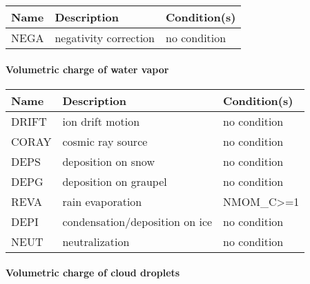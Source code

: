 \begin{longtable} {|p{}|p{}|p{}|}
\hline
Name & Description & Condition(s) \\
\hline \hline
\endhead
NEGA   & negativity correction & no condition \\\hline
\end{longtable}

\paragraph{Volumetric charge of water vapor}
\mbox{} %

\begin{longtable} {|p{}|p{}|p{}|}
\hline
Name & Description & Condition(s) \\
\hline \hline
\endhead
DRIFT  & ion drift motion               & no condition \\\hline
CORAY  & cosmic ray source              & no condition \\\hline
DEPS   & deposition on snow             & no condition \\\hline
DEPG   & deposition on graupel          & no condition \\\hline
REVA   & rain evaporation               & NMOM\_C>=1      \\\hline
DEPI   & condensation/deposition on ice & no condition \\\hline
NEUT   & neutralization                 & no condition \\\hline
\end{longtable}

\paragraph{Volumetric charge of cloud droplets}
\mbox{} %

